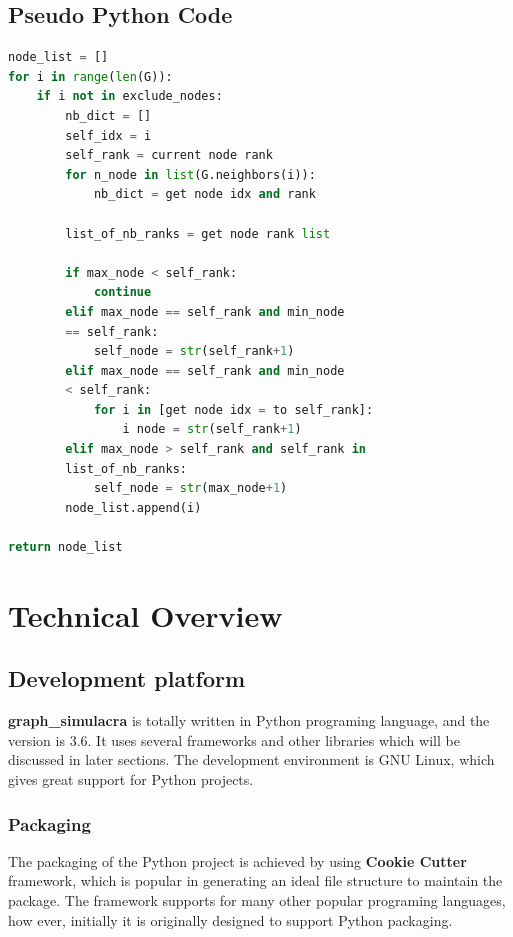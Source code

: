 \documentclass[11pt]{article}
\begin{document}
\subsection{Pseudo Python Code}
\begin{lstlisting}[language=Python]
node_list = []
for i in range(len(G)):
    if i not in exclude_nodes:
        nb_dict = []
        self_idx = i
        self_rank = current node rank
        for n_node in list(G.neighbors(i)):
            nb_dict = get node idx and rank

        list_of_nb_ranks = get node rank list

        if max_node < self_rank:
            continue
        elif max_node == self_rank and min_node 
        == self_rank:
            self_node = str(self_rank+1)
        elif max_node == self_rank and min_node 
        < self_rank:
            for i in [get node idx = to self_rank]:
                i node = str(self_rank+1)
        elif max_node > self_rank and self_rank in 
        list_of_nb_ranks:
            self_node = str(max_node+1)
        node_list.append(i)
            
return node_list
\end{lstlisting}
\section{Technical Overview}

\subsection{Development platform}

\textbf{graph\_simulacra} is totally written in Python programing language, and the version is 3.6. It uses several frameworks and other libraries which will be discussed in later sections. The development environment is GNU Linux, which gives great support for Python projects. 

\subsubsection{Packaging}

The packaging of the Python project is achieved by using \textbf{Cookie Cutter} framework, which is popular in generating an ideal file structure to maintain the package. The framework supports for many other popular programing languages, how ever, initially it is originally designed to support Python packaging.
\end{document}
